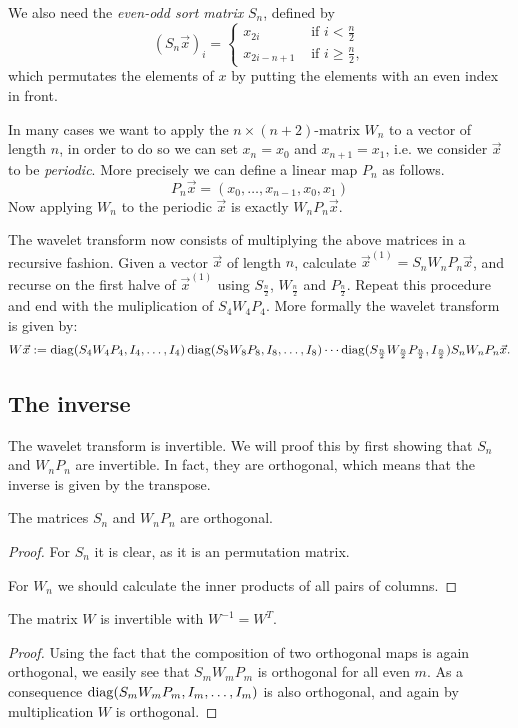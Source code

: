 We also need the \emph{even-odd sort matrix} $S_n$, defined by
\[ (S_n \vec{x})_i = \begin{cases}
	x_{2i}         &\mbox{ if } i  <   \frac{n}{2} \\
	x_{2i - n + 1} &\mbox{ if } i \geq \frac{n}{2},
\end{cases}\]
which permutates the elements of $x$ by putting the elements with an even index in front.

In many cases we want to apply the $n \times (n+2)$-matrix $W_n$ to a vector of length $n$, in order to do so we can set $x_n = x_0$ and $x_{n+1} = x_1$, i.e. we consider $\vec{x}$ to be \emph{periodic}. More precisely we can define a linear map $P_n$ as follows.
\[ P_n \vec{x} = (x_0, \ldots, x_{n-1}, x_0, x_1) \]
Now applying $W_n$ to the periodic $\vec{x}$ is exactly $W_n P_n \vec{x}$.

The wavelet transform now consists of multiplying the above matrices in a recursive fashion. Given a vector $\vec{x}$ of length $n$, calculate $\vec{x}^{(1)} = S_n W_n P_n \vec{x}$, and recurse on the first halve of $\vec{x}^{(1)}$ using $S_\frac{n}{2}$, $W_\frac{n}{2}$ and $P_\frac{n}{2}$. Repeat this procedure and end with the muliplication of $S_4 W_4 P_4$. More formally the wavelet transform is given by:
\[ W \vec{x} := \operatorname{diag}(S_4 W_4 P_4, I_4, \ldots, I_4) 
             \operatorname{diag}(S_8 W_8 P_8, I_8, \ldots, I_8) \cdots
             \operatorname{diag}(S_\frac{n}{2} W_\frac{n}{2} P_\frac{n}{2}, I_\frac{n}{2})
             S_n W_n P_n \vec{x}. \]


\subsection{The inverse}
The wavelet transform is invertible. We will proof this by first showing that $S_n$ and $W_n P_n$ are invertible. In fact, they are orthogonal, which means that the inverse is given by the transpose.

\begin{lemma}
	The matrices $S_n$ and $W_n P_n$ are orthogonal.
\end{lemma}
\begin{proof}
	For $S_n$ it is clear, as it is an permutation matrix.

	For $W_n$ we should calculate the inner products of all pairs of columns.
\end{proof}

\begin{theorem}
	The matrix $W$ is invertible with $W^{-1} = W^T$.
\end{theorem}
\begin{proof}
	Using the fact that the composition of two orthogonal maps is again orthogonal, we easily see that $S_m W_m P_m$ is orthogonal for all even $m$. As a consequence $\operatorname{diag}(S_m W_m P_m, I_m, \ldots, I_m)$ is also orthogonal, and again by multiplication $W$ is orthogonal.
\end{proof}


